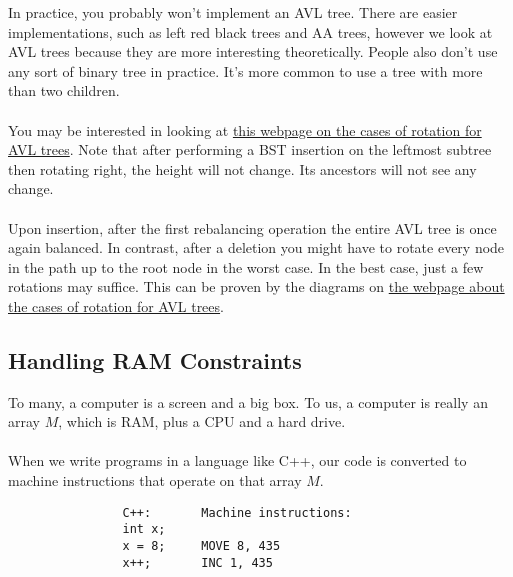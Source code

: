 \documentclass[]{article}
\theoremstyle{definition}
\newcommand{\lecture}[1]{\marginpar{{\footnotesize $\leftarrow$ \underline{#1}}}}
\begin{document}
				In practice, you probably won't implement an AVL tree. There are easier implementations, such as left red black trees and AA trees, however we look at AVL trees because they are more interesting theoretically. People also don't use any sort of binary tree in practice. It's more common to use a tree with more than two children. \lecture{February 12, 2013}
				\\ \\
				You may be interested in looking at \href{http://cs-study.blogspot.ca/2012/11/cases-of-rotation-of-avl-tree.html}{this webpage on the cases of rotation for AVL trees}. Note that after performing a BST insertion on the leftmost subtree then rotating right, the height will not change. Its ancestors will not see any change.
				\\ \\
				Upon insertion, after the first rebalancing operation the entire AVL tree is once again balanced. In contrast, after a deletion you might have to rotate every node in the path up to the root node in the worst case. In the best case, just a few rotations may suffice. This can be proven by the diagrams on \href{http://cs-study.blogspot.ca/2012/11/cases-of-rotation-of-avl-tree.html}{the webpage about the cases of rotation for AVL trees}.
				
		\subsection{Handling RAM Constraints}
			To many, a computer is a screen and a big box. To us, a computer is really an array $M$, which is RAM, plus a CPU and a hard drive.
			\\ \\
			When we write programs in a language like C++, our code is converted to machine instructions that operate on that array $M$.
			\begin{verbatim}
				C++:       Machine instructions:
				int x;     
				x = 8;     MOVE 8, 435
				x++;       INC 1, 435
			\end{verbatim}
\end{document}
